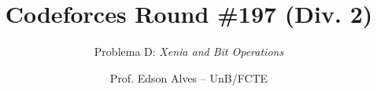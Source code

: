 \title{Codeforces Round \#197 (Div. 2)}
\subtitle{Problema D: \textit{Xenia and Bit Operations}}
\author{Prof. Edson Alves -- UnB/FCTE}
\date{}
